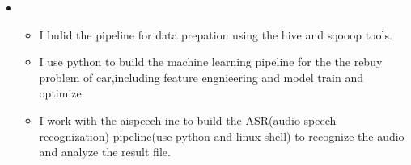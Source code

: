   \begin{itemize}[leftmargin=*]
    \item
           {\small
      \begin{itemize}
      \item I bulid the pipeline for  data prepation using the hive and sqooop tools.
      \item I use python to build the machine learning pipeline for the the rebuy problem of car,including feature engnieering and model train and optimize.
	  \item I work with the aispeech inc to build the ASR(audio speech recognization) pipeline(use python and linux shell) to recognize the audio and analyze the result file. 
            \end{itemize}

             }
    
 \end{itemize}
    
